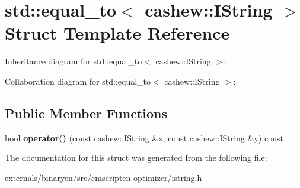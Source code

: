 \hypertarget{structstd_1_1equal__to_3_01cashew_1_1_i_string_01_4}{}\section{std\+:\+:equal\+\_\+to$<$ cashew\+:\+:I\+String $>$ Struct Template Reference}
\label{structstd_1_1equal__to_3_01cashew_1_1_i_string_01_4}


Inheritance diagram for std\+:\+:equal\+\_\+to$<$ cashew\+:\+:I\+String $>$\+:


Collaboration diagram for std\+:\+:equal\+\_\+to$<$ cashew\+:\+:I\+String $>$\+:
\subsection*{Public Member Functions}
\begin{DoxyCompactItemize}
\item 
\mbox{\label{structstd_1_1equal__to_3_01cashew_1_1_i_string_01_4_a5d9119f5bb898874d6f197ee7838510d}} 
bool {\bfseries operator()} (const \mbox{\hyperlink{structcashew_1_1_i_string}{cashew\+::\+I\+String}} \&x, const \mbox{\hyperlink{structcashew_1_1_i_string}{cashew\+::\+I\+String}} \&y) const
\end{DoxyCompactItemize}


The documentation for this struct was generated from the following file\+:\begin{DoxyCompactItemize}
\item 
externals/binaryen/src/emscripten-\/optimizer/istring.\+h\end{DoxyCompactItemize}
